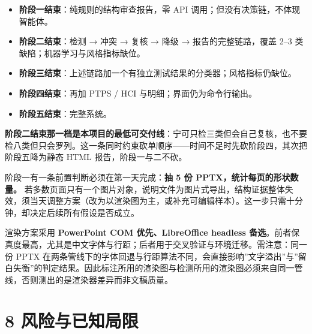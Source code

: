 \documentclass[
  11pt,
]{article}
\providecommand{\tightlist}{%
  \setlength{\itemsep}{0pt}\setlength{\parskip}{0pt}}
\begin{document}
\begin{itemize}
\tightlist
\item
  \textbf{阶段一结束}：纯规则的结构审查报告，零 API
  调用；但没有决策链，不体现智能体。
\item
  \textbf{阶段二结束}：检测 → 冲突 → 复核 → 降级 → 报告的完整链路，覆盖
  2--3 类缺陷；机器学习与风格指标缺位。
\item
  \textbf{阶段三结束}：上述链路加一个有独立测试结果的分类器；风格指标仍缺位。
\item
  \textbf{阶段四结束}：再加 PTPS / HCI 与明细；界面仍为命令行输出。
\item
  \textbf{阶段五结束}：完整系统。
\end{itemize}

\textbf{阶段二结束那一档是本项目的最低可交付线}：宁可只检三类但会自己复核，也不要检八类但只会罗列。这一条同时约束砍单顺序------时间不足时先砍阶段四，其次把阶段五降为静态
HTML 报告，阶段一与二不砍。

阶段一有一条前置判断必须在第一天完成：\textbf{抽 5 份
PPTX，统计每页的形状数量。}
若多数页面只有一个图片对象，说明文件为图片式导出，结构证据整体失效，须当天调整方案（改为以渲染图为主，或补充可编辑样本）。这一步只需十分钟，却决定后续所有假设是否成立。

渲染方案采用 \textbf{PowerPoint COM 优先、LibreOffice headless
备选}。前者保真度最高，尤其是中文字体与行距；后者用于交叉验证与环境迁移。需注意：同一份
PPTX
在两条管线下的字体回退与行距算法不同，会直接影响''文字溢出''与''留白失衡''的判定结果。因此标注所用的渲染图与检测所用的渲染图必须来自同一管线，否则测出的是渲染器差异而非文稿质量。

\section{8
风险与已知局限}\label{ux98ceux9669ux4e0eux5df2ux77e5ux5c40ux9650}
\end{document}
